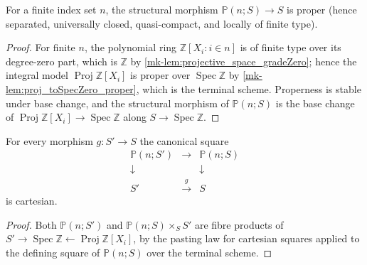 \begin{lemma}
  \label{mk-lem:projective_space_proper}
  \leanok
  For a finite index set \(n\), the structural morphism
  \(\mathbb{P}(n; S) \to S\) is proper (hence separated, universally closed,
  quasi-compact, and locally of finite type).
\end{lemma}

\begin{proof}
  \leanok
  For finite \(n\), the polynomial ring \(\mathbb{Z}[X_i : i \in n]\) is of
  finite type over its degree-zero part, which is \(\mathbb{Z}\) by
  \ref{mk-lem:projective_space_gradeZero}; hence the integral model
  \(\operatorname{Proj} \mathbb{Z}[X_i]\) is proper over
  \(\operatorname{Spec} \mathbb{Z}\) by \ref{mk-lem:proj_toSpecZero_proper},
  which is the terminal scheme.  Properness is stable under base change, and
  the structural morphism of \(\mathbb{P}(n; S)\) is the base change of
  \(\operatorname{Proj} \mathbb{Z}[X_i] \to \operatorname{Spec} \mathbb{Z}\)
  along \(S \to \operatorname{Spec} \mathbb{Z}\).
\end{proof}

\begin{lemma}
  \label{mk-lem:projective_space_base_change}
  \leanok
  For every morphism \(g : S' \to S\) the canonical square
  \[
    \begin{array}{ccc}
      \mathbb{P}(n; S') & \longrightarrow & \mathbb{P}(n; S) \\
      \downarrow & & \downarrow \\
      S' & \xrightarrow{\;g\;} & S
    \end{array}
  \]
  is cartesian.
\end{lemma}

\begin{proof}
  \leanok
  Both \(\mathbb{P}(n; S')\) and \(\mathbb{P}(n; S) \times_S S'\) are fibre
  products of \(S' \to \operatorname{Spec}\mathbb{Z} \leftarrow
  \operatorname{Proj} \mathbb{Z}[X_i]\), by the pasting law for cartesian
  squares applied to the defining square of \(\mathbb{P}(n; S)\) over the
  terminal scheme.
\end{proof}

